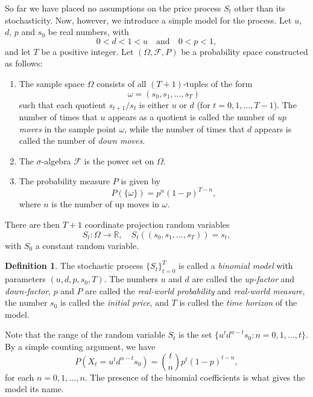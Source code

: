 \documentclass[11pt, openany, oneside]{book}
\theoremstyle{definition}
\newtheorem{defn}[thm]{Definition}
\theoremstyle{remark}
\theoremstyle{boldital}
\numberwithin{equation}{section}
\begin{document}
So far we have placed no assumptions on the price process $S_t$ other than its stochasticity. Now, however, we introduce a simple model for the process. Let $u$, $d$, $p$ and $s_0$ be real numbers, with
	\[
	0 < d < 1 < u \quad \text{and} \quad 0 < p < 1,
	\]
and let $T$ be a positive integer. Let $(\Omega, \mathcal{F},P)$ be a probability space constructed as follows:
\begin{enumerate}
\item The sample space $\Omega$ consists of all $(T+1)$-tuples of the form
	\[
	\omega = (s_0, s_1,\ldots,s_T)
	\]
such that each quotient $s_{t+1} / s_t$ is either $u$ or $d$ (for $t=0,1,\ldots, T-1$). The number of times that $u$ appears as a quotient is called the number of \textit{up moves} in the sample point $\omega$, while the number of times that $d$ appears is called the number of \textit{down moves}.
\item The $\sigma$-algebra $\mathcal{F}$ is the power set on $\Omega$.
\item The probability measure $P$ is given by
	\begin{equation}\label{eq:real-world-measure}
	P \left( \{\omega\} \right) = p^n (1-p)^{T-n},
	\end{equation}
	where $n$ is the number of up moves in $\omega$.
\end{enumerate}
There are then $T+1$ coordinate projection random variables
	\begin{equation}\label{eq:binomial-proj}
	S_t: \Omega \to \mathbb{R}, \quad S_t\left( (s_0, s_1,\ldots,s_T)\right) = s_t,
	\end{equation}
with $S_0$ a constant random variable. 

\begin{defn}\label{defn:binomial}
The stochastic process $\{S_t\}_{t=0}^T$ is called a \textit{binomial model} with parameters $(u,d,p,s_0,T)$. The numbers $u$ and $d$ are called the \textit{up-factor} and \textit{down-factor}, $p$ and $P$ are called the \textit{real-world probability} and \textit{real-world measure}, the number $s_0$ is called the \textit{initial price}, and $T$ is called the \textit{time horizon} of the model.
\end{defn}

Note that the range of the random variable $S_t$ is the set $\{u^t d^{n-t}s_0 : n=0,1,\ldots,t\}$. By a simple counting argument, we have
	\begin{equation}\label{eq:binom-prob}
	P(X_t = u^t d^{n-t}s_0) = \binom{t}{n}p^t(1-p)^{t-n},
	\end{equation}
for each $n=0,1,\ldots,n$. The presence of the binomial coefficients is what gives the model its name.
\end{document}
